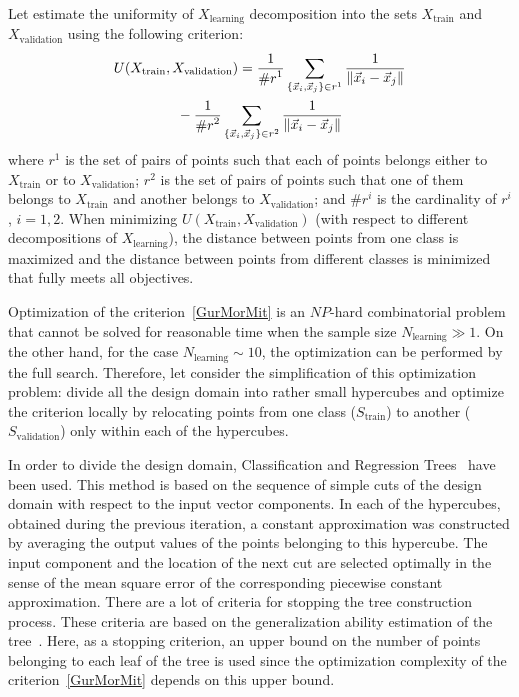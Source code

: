 \begin{multicols}{2}
Let estimate the uniformity of $X_{\mathrm{learning}}$ decomposition into the 
sets $X_{\mathrm{train}}$ and $X_{\mathrm{validation}}$ using the following criterion:
\begin{multline}
  \label{GurMorMit}
   U(X_{\mathrm{train}}, X_{\mathrm{validation}}) = 
   \displaystyle\frac{\displaystyle 1\mathstrut}{\displaystyle \# r^{1}\mathstrut}\sum\limits_{ \{\vec x_i, \vec x_j\} \in r^{1}} 
   \displaystyle\frac{\displaystyle 1\mathstrut}{\displaystyle \| \vec x_i - \vec x_j\|\mathstrut}\\
   {} - \displaystyle\frac{\displaystyle 1\mathstrut}{\displaystyle \# r^{2}\mathstrut}
   \sum\limits_{ \{\vec x_i, \vec x_j\} \in r^{2}} \displaystyle\frac{\displaystyle 1\mathstrut}{\displaystyle \|\vec x_i - \vec x_j\|\mathstrut}
\end{multline}
where $r^{1}$ is the set of pairs of points such that each of points belongs either to
 $X_{\mathrm{train}}$ or to $X_{\mathrm{validation}}$;
  $r^{2}$ is the set of pairs of points such that one of them belongs to
 $X_{\mathrm{train}}$ and another belongs to $X_{\mathrm{validation}}$; and
  $\# r^{i}$ is the cardinality of $r^{i}$, $i = 1, 2$.
  When minimizing  $U(X_{\mathrm{train}}, X_{\mathrm{validation}})$ 
  (with respect to different decompositions of $X_{\mathrm{learning}}$), 
  the distance between points from one class is maximized and the distance 
  between points from different classes is minimized that fully meets all objectives.

Optimization of the criterion~\eqref{GurMorMit} is an $NP$-hard combinatorial problem
that cannot be solved for reasonable time when the sample size $N_{\mathrm{learning}} \gg 1$. 
On the other hand, for the case $N_{\mathrm{learning}} \sim 10$, the optimization 
can be performed by 
the full search. Therefore, let consider the simplification of this optimization problem:
divide all the design domain into rather small hypercubes and optimize the criterion locally by relocating points from one class
 ($S_{\mathrm{train}}$) to another  ($S_{\mathrm{validation}}$) only within each of the hypercubes.
 
In order to divide the design domain, Classification and Regression Trees~\cite{CART} have been used. 
This method is based on the sequence of simple cuts of the design domain with respect to 
the input vector components. In each of the hypercubes, obtained during the previous iteration, 
a constant approximation was constructed by averaging the output values of the points belonging to this 
hypercube.
The input component and the location of the next cut are selected optimally in the 
sense of the mean square error of the corresponding piecewise constant approximation.
There are a lot of criteria for stopping the tree construction process. These criteria are 
based on the generalization ability estimation of the tree~\cite{elementsOfStatLearning}. 
Here, as a stopping criterion, an upper bound on the number of points belonging 
to each leaf of the tree is used since the optimization complexity of the criterion~\eqref{GurMorMit} 
depends on this upper bound.


\end{multicols}
